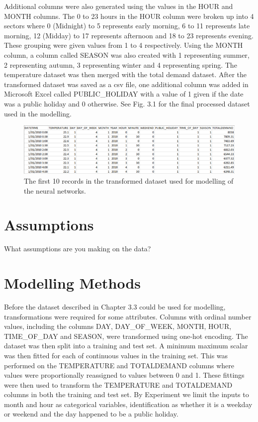\documentclass[mstat,12pt]{unswthesis}
\begin{document}
Additional columns were also generated using the values in the HOUR and
MONTH columns. The 0 to 23 hours in the HOUR column were broken up into
4 sectors where 0 (Midnight) to 5 represents early morning, 6 to 11
represents late morning, 12 (Midday) to 17 represents afternoon and 18
to 23 represents evening. These grouping were given values from 1 to 4
respectively. Using the MONTH column, a column called SEASON was also
created with 1 representing summer, 2 representing autumn, 3
representing winter and 4 representing spring. The temperature dataset
was then merged with the total demand dataset. After the transformed
dataset was saved as a csv file, one additional column was added in
Microsoft Excel called PUBLIC\_HOLIDAY with a value of 1 given if the
date was a public holiday and 0 otherwise. See Fig. 3.1 for the final
processed dataset used in the modelling.

\begin{figure}[H]
\includegraphics{first_10_records.png}
\caption{The first 10 records in the transformed dataset used for modelling of the neural networks.}\label{3.1}
\end{figure}

\hypertarget{assumptions}{%
\section{Assumptions}\label{assumptions}}

What assumptions are you making on the data?

\hypertarget{modelling-methods}{%
\section{Modelling Methods}\label{modelling-methods}}

Before the dataset described in Chapter 3.3 could be used for modelling,
transformations were required for some attributes. Columns with ordinal
number values, including the columns DAY, DAY\_OF\_WEEK, MONTH, HOUR,
TIME\_OF\_DAY and SEASON, were transformed using one-hot encoding. The
dataset was then split into a training and test set. A minimum maximum
scalar was then fitted for each of continuous values in the training
set. This was performed on the TEMPERATURE and TOTALDEMAND columns where
values were proportionally reassigned to values between 0 and 1. These
fittings were then used to transform the TEMPERATURE and TOTALDEMAND
columns in both the training and test set. By Experiment we limit the
inputs to month and hour as categorical variables, identification as
whether it is a weekday or weekend and the day happened to be a public
holiday.
\end{document}
